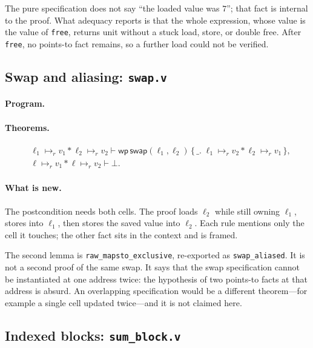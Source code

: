 \documentclass[11pt]{article}
\newcommand{\ptsr}{\mathrel{\mapsto_{r}}}
\newcommand{\sep}{\mathbin{*}}
\newcommand{\Wpre}{\mathsf{wp}}
\begin{document}
The pure specification does not say ``the loaded value was \(7\)''; that fact is internal to the proof.
What adequacy reports is that the whole expression, whose value is the value of \texttt{free}, returns unit without a stuck load, store, or double free.
After \texttt{free}, no points-to fact remains, so a further load could not be verified.

\subsection{Swap and aliasing: \texttt{swap.v}}

\paragraph{Program.}\mbox{}\par


\paragraph{Theorems.}
\[
\begin{aligned}
&\ell_1 \ptsr v_1 \sep \ell_2 \ptsr v_2
  \vdash
  \Wpre\,\mathsf{swap}(\ell_1,\ell_2)\,
    \{\,\_.\; \ell_1 \ptsr v_2 \sep \ell_2 \ptsr v_1\,\},\\
&\ell \ptsr v_1 \sep \ell \ptsr v_2 \vdash \bot.
\end{aligned}
\]

\paragraph{What is new.}
The postcondition needs both cells.
The proof loads \(\ell_2\) while still owning \(\ell_1\), stores into \(\ell_1\), then stores the saved value into \(\ell_2\).
Each rule mentions only the cell it touches; the other fact sits in the context and is framed.

The second lemma is \texttt{raw\_mapsto\_exclusive}, re-exported as \texttt{swap\_aliased}.
It is not a second proof of the same swap.
It says that the swap specification cannot be instantiated at one address twice: the hypothesis of two points-to facts at that address is absurd.
An overlapping specification would be a different theorem---for example a single cell updated twice---and it is not claimed here.

\subsection{Indexed blocks: \texttt{sum\_block.v}}
\end{document}
